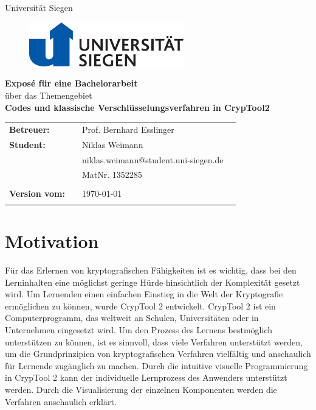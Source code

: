 \documentclass[fontsize=11pt, paper=a4, parskip=half]{scrartcl}
\begin{document}
\thispagestyle{empty}

\begin{center}
\Large{Universität Siegen}\\
\end{center}

\begin{figure}[t]
 \centering
 \includegraphics[width=0.6\textwidth]{images/uni-siegen.png}
\end{figure}

\vspace{2.5cm}
\begin{center}
\textbf{\LARGE{Exposé für eine Bachelorarbeit}}\\
\Large{über das Themengebiet}\\
\textbf{\LARGE{Codes und klassische Verschlüsselungsverfahren in CrypTool2}}\\
\end{center}
\vspace{6cm}
\begin{flushleft}
\begin{tabular}{llll}
\textbf{Betreuer:} & & Prof. Bernhard Esslinger  & \\
\textbf{Student:} & & Niklas Weimann & \\
& & niklas.weimann@student.uni-siegen.de & \\
& & MatNr. 1352285 & \\
& & \\
\textbf{Version vom:} & & \today &\\
& & \\
\end{tabular}
\end{flushleft}
\newpage

\tableofcontents
\newpage

\section{Motivation}
Für das Erlernen von kryptografischen Fähigkeiten ist es wichtig, dass bei den Lerninhalten eine möglichst geringe Hürde hinsichtlich der Komplexität gesetzt wird. Um Lernenden einen einfachen Einstieg in die Welt der Kryptografie ermöglichen zu können, wurde CrypTool 2 entwickelt. CrypTool 2 ist ein Computerprogramm, das weltweit an Schulen, Universitäten oder in Unternehmen eingesetzt wird. Um den Prozess des Lernens bestmöglich unterstützen zu können, ist es sinnvoll, dass viele Verfahren unterstützt werden, um die Grundprinzipien von kryptografischen Verfahren vielfältig und anschaulich für Lernende zugänglich zu machen. Durch die intuitive visuelle Programmierung in CrypTool 2 kann der individuelle Lernprozess des Anwenders unterstützt werden. Durch die Visualisierung der einzelnen Komponenten werden die Verfahren anschaulich erklärt.
\end{document}
